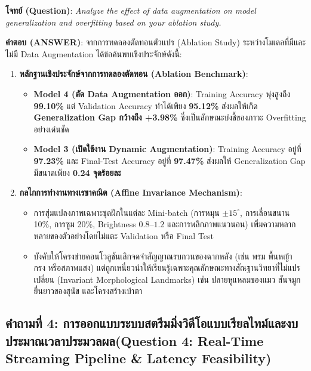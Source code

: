 \documentclass[12pt,a4paper]{article}
\begin{document}
\begin{ansbox}[fontupper=\small, left=6pt, right=6pt, top=3pt, bottom=3pt]
\textbf{โจทย์ (Question)}: \textit{Analyze the effect of data augmentation on model generalization and overfitting based on your ablation study.}

\vspace{0.25em}
\textbf{คำตอบ (ANSWER)}:
จากการทดลองตัดทอนตัวแปร (Ablation Study) ระหว่างโมเดลที่มีและไม่มี Data Augmentation ได้ข้อค้นพบเชิงประจักษ์ดังนี้:

\begin{enumerate}[leftmargin=14pt, itemsep=1.5pt, topsep=1pt, parsep=0pt]
    \item \textbf{หลักฐานเชิงประจักษ์จากการทดลองตัดทอน (Ablation Benchmark)}:
    \begin{itemize}[leftmargin=10pt, itemsep=0.5pt, topsep=0.5pt, parsep=0pt]
        \item \textbf{Model 4 (ตัด Data Augmentation ออก)}: Training Accuracy พุ่งสูงถึง \textbf{99.10\%} แต่ Validation Accuracy ทำได้เพียง \textbf{95.12\%} ส่งผลให้เกิด \textbf{Generalization Gap กว้างถึง +3.98\%} ซึ่งเป็นลักษณะบ่งชี้ของภาวะ Overfitting อย่างเด่นชัด
        \item \textbf{Model 3 (เปิดใช้งาน Dynamic Augmentation)}: Training Accuracy อยู่ที่ \textbf{97.23\%} และ Final-Test Accuracy อยู่ที่ \textbf{97.47\%} ส่งผลให้ Generalization Gap มีขนาดเพียง \textbf{0.24 จุดร้อยละ}
    \end{itemize}
    \item \textbf{กลไกการทำงานทางเรขาคณิต (Affine Invariance Mechanism)}:
    \begin{itemize}[leftmargin=10pt, itemsep=0.5pt, topsep=0.5pt, parsep=0pt]
        \item การสุ่มแปลงภาพเฉพาะชุดฝึกในแต่ละ Mini-batch (การหมุน $\pm 15^\circ$, การเลื่อนขนาน 10\%, การซูม 20\%, Brightness $0.8$--$1.2$ และการพลิกภาพแนวนอน) เพิ่มความหลากหลายของตัวอย่างโดยไม่แตะ Validation หรือ Final Test
        \item บังคับให้โครงข่ายคอนโวลูชันเลิกจดจำสัญญาณรบกวนของฉากหลัง (เช่น พรม พื้นหญ้า กรง หรือสภาพแสง) แต่ถูกเหนี่ยวนำให้เรียนรู้เฉพาะคุณลักษณะทางสัณฐานวิทยาที่ไม่แปรเปลี่ยน (Invariant Morphological Landmarks) เช่น ปลายหูแหลมของแมว สันจมูกยื่นยาวของสุนัข และโครงสร้างเบ้าตา
    \end{itemize}
\end{enumerate}
\end{ansbox}

\clearpage
\subsection*{คำถามที่ 4: การออกแบบระบบสตรีมมิ่งวิดีโอแบบเรียลไทม์และงบประมาณเวลาประมวลผล\newline \normalsize(Question 4: Real-Time Streaming Pipeline \& Latency Feasibility)}
\end{document}
